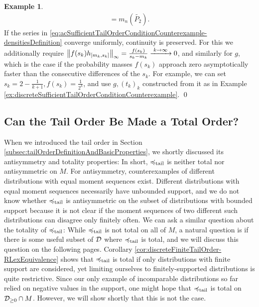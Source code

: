 \documentclass[a4paper,DIV=11,abstracton,twoside=semi]{scrreprt}
\theoremstyle{definition}
\newtheorem{ex}[thm]{Example} %
\begin{document}
\begin{ex}
\begin{multline*}
            = m_n(\tilde{P_2}).
        \end{multline*}
        If the series in \eqref{eq:acSufficientTailOrderConditionCounterexample-densitiesDefinition} converge uniformly, continuity is preserved.
        For this we additionally require $\left\lVert f(s_k) h_{[m_k, s_k]}\right\rVert_\infty = \frac{f(s_k)}{s_k - m_k} \xrightarrow{\;k \to \infty\;} 0$, and similarly for $g$, which is the case if the probability masses $f(s_k)$ approach zero asymptotically faster than the consecutive differences of the $s_k$. For example, we can set $s_k = 2-\frac{1}{k+1}, f(s_k) = \frac{1}{2^k}$, and use $g, (t_k)_k$ constructed from it as in Example \ref{ex:discreteSufficientTailOrderConditionCounterexample}.
        \qed
    \end{ex}
    
    \subsection{Can the Tail Order Be Made a Total Order?}
    \label{subsec:tailOrderTotality}
    When we introduced the tail order in Section \ref{subsec:tailOrderDefinitionAndBasicProperties}, we shortly discussed its antisymmetry and totality properties: In short, $\preccurlyeq_{\text{tail}}$ is neither total nor antisymmetric on $M$. For antisymmetry, counterexamples of different distributions with equal moment sequences exist. Different distributions with equal moment sequences necessarily have unbounded support, and we do not know whether $\preccurlyeq_{\text{tail}}$ is antisymmetric on the subset of distributions with bounded support because it is not clear if the moment sequences of two different such distributions can disagree only finitely often.
    We can ask a similar question about the totality of $\preccurlyeq_{\text{tail}}$: While $\preccurlyeq_{\text{tail}}$ is not total on all of $M$,
    a natural question is if there is some useful subset of $\mathcal{D}$ where $\preccurlyeq_{\text{tail}}$ is total, and we will discuss this question on the following pages.
    Corollary \ref{cor:discreteFiniteTailOrder-RLexEquivalence} shows that $\preccurlyeq_{\text{tail}}$ is total if only distributions with finite support are considered, yet limiting ourselves to finitely-supported distributions is quite restrictive.
    Since our only example of incomparable distributions so far relied on negative values in the support, one might hope that $\preccurlyeq_{\text{tail}}$ is total on $\mathcal{D}_{\geq 0} \cap M$. However, we will show shortly that this is not the case.
    
\end{document}
